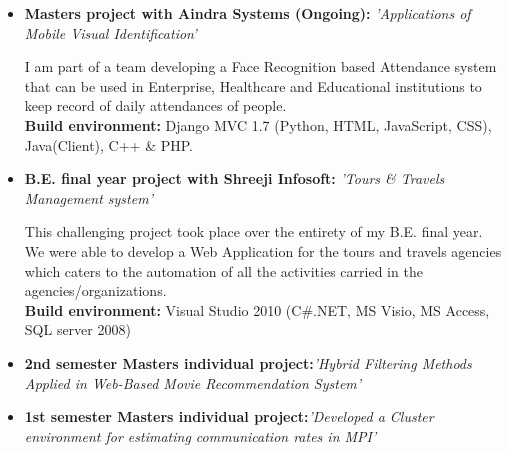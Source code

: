 \documentclass[11pt,a4paper,sans]{moderncv}        %
\begin{document}
\vspace{5pt}

\begin{itemize}

\item{\textbf{Masters project with Aindra Systems (Ongoing):} \textit{'Applications of Mobile Visual Identification'}

\vspace{3pt}

\small{I am part of a team developing a Face Recognition based Attendance system that can be used in Enterprise, Healthcare and Educational institutions to keep record of daily attendances of people.}
\\ \textbf{ Build environment:} Django MVC 1.7 (Python, HTML, JavaScript, CSS), Java(Client), C++ \& PHP.
}

\newpage

\item{\textbf{B.E. final year project with Shreeji Infosoft:} \textit{'Tours \& Travels Management system'}

\vspace{3pt}

\small{This challenging project took place over the entirety of my B.E. final year. We were able to develop a Web Application for the tours and travels agencies which caters to the automation of all the activities carried in the agencies/organizations.}
\\ \textbf{ Build environment:} Visual Studio 2010 (C\#.NET, MS Visio, MS Access, SQL server 2008)
}

\vspace{8pt}

\item{\textbf{2nd semester Masters individual project:}\textit{'Hybrid Filtering Methods Applied in Web-Based Movie Recommendation System'}}

\vspace{8pt}

\item{\textbf{1st semester Masters individual project:}\textit{'Developed a Cluster environment for estimating communication rates in MPI'}}




\end{itemize}
\end{document}

